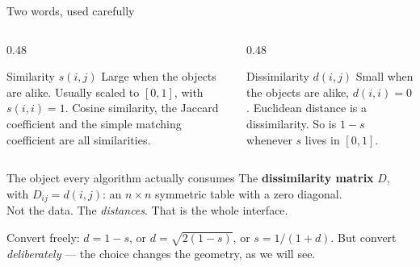 \documentclass[aspectratio=169]{beamer}
\begin{document}
\begin{frame}[shrink=14]{Two words, used carefully}
  \begin{columns}[T]
    \begin{column}{0.48\textwidth}
      \begin{block}{Similarity $s(i,j)$}
        Large when the objects are alike. Usually scaled to $[0,1]$, with
        $s(i,i)=1$. Cosine similarity, the Jaccard coefficient and the
        simple matching coefficient are all similarities.
      \end{block}
    \end{column}
    \begin{column}{0.48\textwidth}
      \begin{block}{Dissimilarity $d(i,j)$}
        Small when the objects are alike, $d(i,i)=0$. Euclidean distance is
        a dissimilarity. So is $1-s$ whenever $s$ lives in $[0,1]$.
      \end{block}
    \end{column}
  \end{columns}
  \vspace{0.5em}
  \begin{exampleblock}{The object every algorithm actually consumes}
    \centering
    The \textbf{dissimilarity matrix} $D$, with $D_{ij} = d(i,j)$: an
    $n \times n$ symmetric table with a zero diagonal.\\[0.3em]
    \small Not the data. The \emph{distances}. That is the whole interface.
  \end{exampleblock}
  \begin{center}
    \small Convert freely: $d = 1-s$, or $d = \sqrt{2(1-s)}$, or
    $s = 1/(1+d)$. But convert \emph{deliberately} --- the choice changes
    the geometry, as we will see.
  \end{center}
\end{frame}
\end{document}
